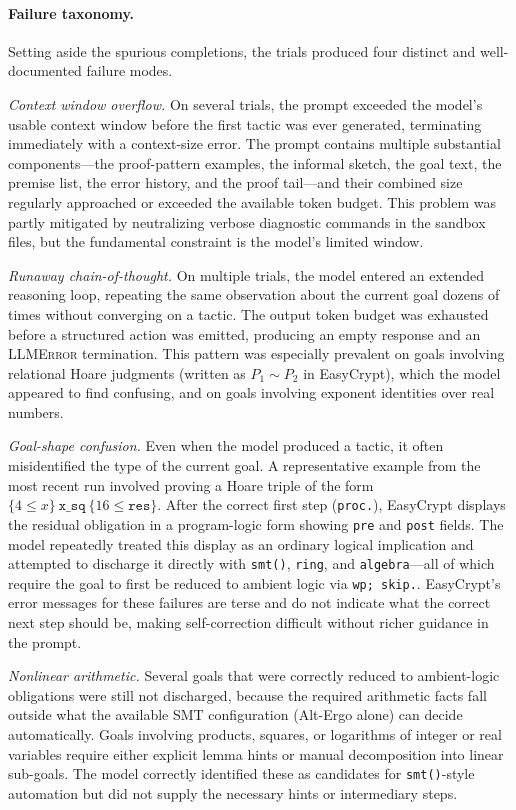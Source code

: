 \documentclass[acmsmall,natbib=false]{acmart}
\begin{document}
\paragraph{Failure taxonomy.} Setting aside the spurious completions, the trials produced four distinct and well-documented failure modes.

\textit{Context window overflow.} On several trials, the prompt exceeded the model's usable context window before the first tactic was ever generated, terminating immediately with a context-size error. The prompt contains multiple substantial components---the proof-pattern examples, the informal sketch, the goal text, the premise list, the error history, and the proof tail---and their combined size regularly approached or exceeded the available token budget. This problem was partly mitigated by neutralizing verbose diagnostic commands in the sandbox files, but the fundamental constraint is the model's limited window.

\textit{Runaway chain-of-thought.} On multiple trials, the model entered an extended reasoning loop, repeating the same observation about the current goal dozens of times without converging on a tactic. The output token budget was exhausted before a structured action was emitted, producing an empty response and an \textsc{LLMError} termination. This pattern was especially prevalent on goals involving relational Hoare judgments (written as $P_1 \sim P_2$ in EasyCrypt), which the model appeared to find confusing, and on goals involving exponent identities over real numbers.

\textit{Goal-shape confusion.} Even when the model produced a tactic, it often misidentified the type of the current goal. A representative example from the most recent run involved proving a Hoare triple of the form $\{4 \leq x\}\ \texttt{x\_sq}\ \{16 \leq \mathtt{res}\}$. After the correct first step (\texttt{proc.}), EasyCrypt displays the residual obligation in a program-logic form showing \texttt{pre} and \texttt{post} fields. The model repeatedly treated this display as an ordinary logical implication and attempted to discharge it directly with \texttt{smt()}, \texttt{ring}, and \texttt{algebra}---all of which require the goal to first be reduced to ambient logic via \texttt{wp; skip.}. EasyCrypt's error messages for these failures are terse and do not indicate what the correct next step should be, making self-correction difficult without richer guidance in the prompt.

\textit{Nonlinear arithmetic.} Several goals that were correctly reduced to ambient-logic obligations were still not discharged, because the required arithmetic facts fall outside what the available SMT configuration (Alt-Ergo alone) can decide automatically. Goals involving products, squares, or logarithms of integer or real variables require either explicit lemma hints or manual decomposition into linear sub-goals. The model correctly identified these as candidates for \texttt{smt()}-style automation but did not supply the necessary hints or intermediary steps.
\end{document}
